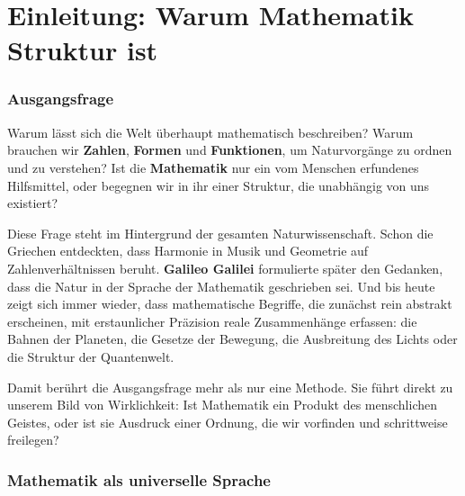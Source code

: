 \chapter{Einleitung: Warum Mathematik Struktur ist}
\label{chap:I_einfuehrung}

\setlength{\parindent}{0pt}
\subsection{Ausgangsfrage}

Warum lässt sich die Welt überhaupt mathematisch beschreiben?
Warum brauchen wir \textbf{Zahlen}, \textbf{Formen} und \textbf{Funktionen},
um Naturvorgänge zu ordnen und zu verstehen?
Ist die \textbf{Mathematik} nur ein vom Menschen erfundenes Hilfsmittel,
oder begegnen wir in ihr einer Struktur,
die unabhängig von uns existiert?

Diese Frage steht im Hintergrund der gesamten Naturwissenschaft.
Schon die Griechen entdeckten,
dass Harmonie in Musik und Geometrie auf Zahlenverhältnissen beruht.
\textbf{Galileo Galilei} formulierte später den Gedanken,
dass die Natur in der Sprache der Mathematik geschrieben sei.
Und bis heute zeigt sich immer wieder,
dass mathematische Begriffe,
die zunächst rein abstrakt erscheinen,
mit erstaunlicher Präzision reale Zusammenhänge erfassen:
die Bahnen der Planeten,
die Gesetze der Bewegung,
die Ausbreitung des Lichts
oder die Struktur der Quantenwelt.

Damit berührt die Ausgangsfrage mehr als nur eine Methode.
Sie führt direkt zu unserem Bild von Wirklichkeit:
Ist Mathematik ein Produkt des menschlichen Geistes,
oder ist sie Ausdruck einer Ordnung,
die wir vorfinden und schrittweise freilegen?



\subsection{Mathematik als universelle Sprache}
\label{sec:1.2_universelle_sprache}

